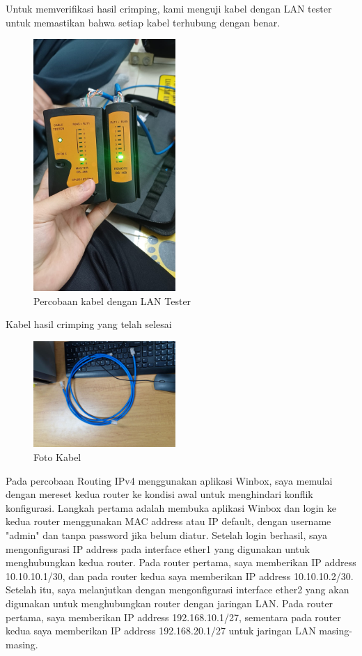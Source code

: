 Untuk memverifikasi hasil crimping, kami menguji kabel dengan LAN tester untuk memastikan bahwa setiap kabel terhubung dengan benar. 

\begin{figure}[H]
    \centering
    \includegraphics[width=0.48\textwidth]{P1/img/Crimping 3.jpeg}
    \caption{Percobaan kabel dengan LAN Tester}
    \label{fig:crimping3}
\end{figure}

Kabel hasil crimping yang telah selesai 

\begin{figure}[H]
    \centering
    \includegraphics[width=0.48\textwidth]{P1/img/Crimping 4.jpeg}
    \caption{Foto Kabel}
    \label{fig:crimping4}
\end{figure}

\newpage
Pada percobaan Routing IPv4 menggunakan aplikasi Winbox, saya memulai dengan mereset kedua router ke kondisi awal untuk menghindari konflik konfigurasi. Langkah pertama adalah membuka aplikasi Winbox dan login ke kedua router menggunakan MAC address atau IP default, dengan username "admin" dan tanpa password jika belum diatur. Setelah login berhasil, saya mengonfigurasi IP address pada interface ether1 yang digunakan untuk menghubungkan kedua router. Pada router pertama, saya memberikan IP address 10.10.10.1/30, dan pada router kedua saya memberikan IP address 10.10.10.2/30. Setelah itu, saya melanjutkan dengan mengonfigurasi interface ether2 yang akan digunakan untuk menghubungkan router dengan jaringan LAN. Pada router pertama, saya memberikan IP address 192.168.10.1/27, sementara pada router kedua saya memberikan IP address 192.168.20.1/27 untuk jaringan LAN masing-masing. 

